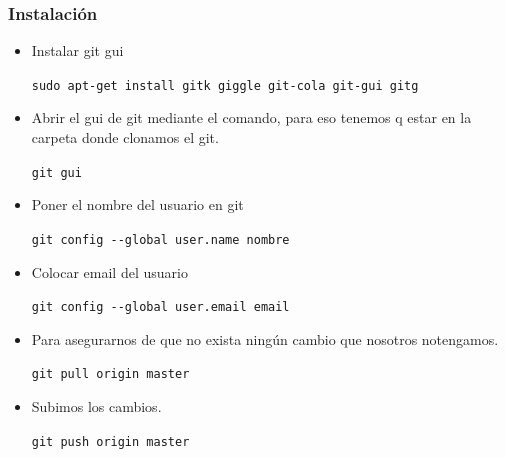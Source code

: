 \documentclass{beamer}
\begin{document}
	\begin{frame}
		\frametitle{Instalación}
		\begin{itemize}
			\item Instalar git gui
			\begin{center}
				 {\tt \scriptsize sudo apt-get install gitk giggle git-cola git-gui gitg}\\
			\end{center}
			\item Abrir el gui de git mediante el comando, para eso tenemos q estar en
la carpeta donde clonamos el git. 
			\begin{center}
				 {\tt \scriptsize git gui}\\
			\end{center}
			\item Poner el nombre del usuario en git
			\begin{center}
				 {\tt \scriptsize git config -{}-global user.name nombre}\\	 
			\end{center}
			\item Colocar email del usuario
			\begin{center}
				 {\tt \scriptsize git config -{}-global user.email email}\\	 
			\end{center}
			\item Para asegurarnos de que no exista ning\'un cambio que nosotros notengamos.
			\begin{center}
				 {\tt \scriptsize git pull origin master}\\	 
			\end{center}
			\item Subimos los cambios.
			\begin{center}
				 {\tt \scriptsize git push origin master}\\	 
			\end{center}
		\end{itemize}
	\end{frame}
\end{document}
